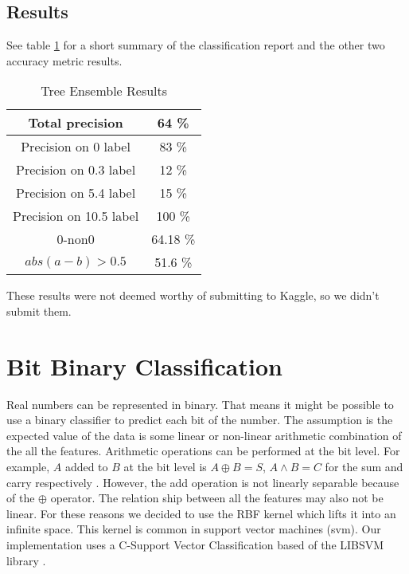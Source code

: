 \documentclass[pdftex,a4paper,12pt]{article}
\begin{document}
\subsection{Results}
See table \ref{table:treeEnsembleReport} for a short summary of the classification report and the other two accuracy metric results. 
  \begin{table}[h]
        {\centering
          \begin{tabular}{|c|c|}
            \hline
             Total precision & 64 \% \\
            \hline
                Precision on 0 label &   83 \% \\
             \hline
                Precision on 0.3 label &   12 \%  \\
                \hline 
                Precision on 5.4 label &   15 \%  \\
                \hline
                Precision on 10.5 label &   100 \%  \\
                  \hline
                  \hline 
                  0-non0 & 64.18 \%\\
                  \hline
                 $abs(a - b) > 0.5$ & 51.6 \% \\
                  \hline
          \end{tabular}
          \caption{Tree Ensemble Results}          
          \label{table:treeEnsembleReport}}
  \end{table}
These results were not deemed worthy of submitting to Kaggle, so we didn't submit them.
  

\section{Bit Binary Classification}
Real numbers can be represented in binary.  That means it might be possible to use a binary classifier to predict each bit of the number.  The assumption is the expected value of the data is some linear or non-linear arithmetic combination of the all the features.  Arithmetic operations can be performed at the bit level.  For example, $A$ added to $B$ at the bit level is $A \oplus B = S$, $A \land B = C$ for the sum and carry respectively \cite{lancaster2001excel}.  However, the add operation is not linearly separable because of the $\oplus$ operator.  The relation ship between all the features may also not be linear.  For these reasons we decided to use the RBF kernel which lifts it into an infinite space. This kernel is common in support vector machines (svm).  Our implementation uses a C-Support Vector Classification based of the LIBSVM library \cite{LIBSVM}\cite{scikit-learn}.\\
\end{document}
